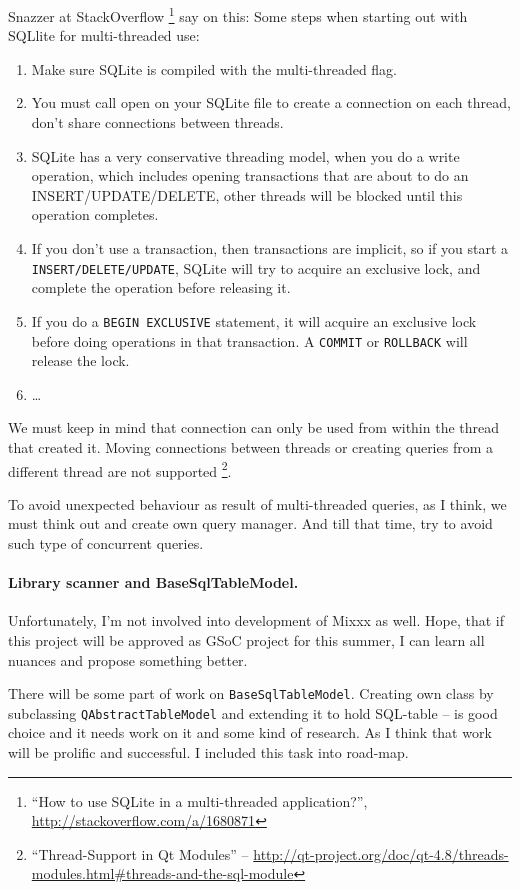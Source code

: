 \documentclass[a4paper,12pt]{scrartcl}
\begin{document}
Snazzer at StackOverflow%
\footnote{``How to use SQLite in a multi-threaded application?'', \url{http://stackoverflow.com/a/1680871}}
say on this:
Some steps when starting out with SQLlite for multi-threaded use:
\begin{enumerate}
 \item Make sure SQLite is compiled with the multi-threaded flag.
 \item You must call open on your SQLite file to create a connection on each thread, don't share connections 
    between threads.
 \item SQLite has a very conservative threading model, when you do a write operation, which includes opening 
    transactions that are about to do an INSERT/UPDATE/DELETE, other threads will be blocked until this 
    operation completes.
 \item If you don't use a transaction, then transactions are implicit, so if you start a 
    \texttt{INSERT/DELETE/UPDATE}, SQLite will try to acquire an exclusive lock, and complete the operation 
    before releasing it.
 \item If you do a \texttt{BEGIN EXCLUSIVE} statement, it will acquire an exclusive lock before doing operations 
    in that transaction. A \texttt{COMMIT} or \texttt{ROLLBACK} will release the lock.
 \item \ldots
\end{enumerate}

We must keep in mind that connection can only be used from within the thread that created it. Moving connections 
between threads or creating queries from a different thread are not supported%
\footnote{``Thread-Support in Qt Modules'' --
\url{http://qt-project.org/doc/qt-4.8/threads-modules.html\#threads-and-the-sql-module}}.

To avoid unexpected behaviour as result of multi-threaded queries, as I think, we must think out and create own 
query manager. And till that time, try to avoid such type of concurrent queries.

\paragraph{Library scanner and BaseSqlTableModel.} Unfortunately, I'm not involved into development of 
Mixxx as well. Hope, that if this project will be approved as GSoC project for this summer, I can learn all nuances
and propose something better.

There will be some part of work on \texttt{BaseSqlTableModel}. Creating own class by subclassing \texttt{QAbstractTableModel}
and extending it to hold SQL-table -- is good choice and it needs work on it and some kind of research. As I think that work 
will be prolific and successful. I included this task into road-map.
\end{document}
